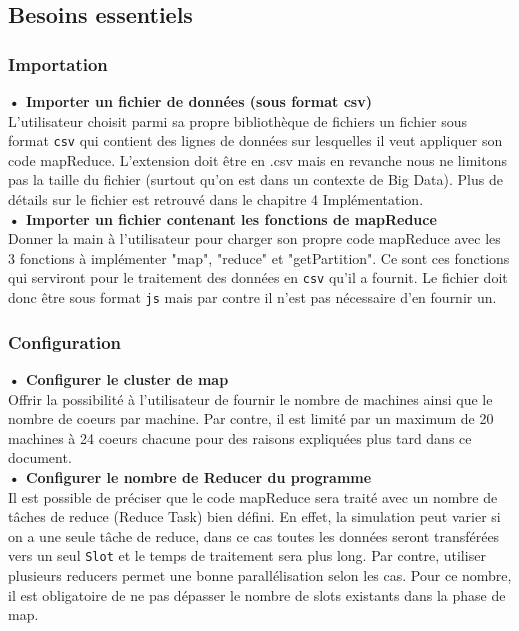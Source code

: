 \documentclass[12pt,a4paper]{article}
\begin{document}
\subsection{Besoins essentiels}


\subsubsection{Importation}

\textbf{• Importer un fichier de données (sous format csv)\\} L'utilisateur choisit parmi sa propre bibliothèque de fichiers un fichier sous format {\tt csv} qui contient des lignes de données sur lesquelles il veut appliquer son code mapReduce. L'extension doit être en .csv mais en revanche nous ne limitons pas la taille du fichier (surtout qu'on est dans un contexte de Big Data). Plus de détails sur le fichier est retrouvé dans le chapitre 4 Implémentation.\\

\textbf{• Importer un fichier contenant les fonctions de mapReduce\\}   
 Donner la main à l'utilisateur pour charger son propre code mapReduce avec les 3 fonctions à implémenter "map", "reduce" et "getPartition". Ce sont ces fonctions qui serviront pour le traitement des données en {\tt csv} qu'il a fournit. Le fichier doit donc être sous format {\tt js} mais par contre il n'est pas nécessaire d'en fournir un.\\

\subsubsection{Configuration} 

\textbf{• Configurer le cluster de map\\ } Offrir la possibilité à l'utilisateur de fournir le nombre de machines ainsi que le nombre de coeurs par machine. Par contre, il est limité par un maximum de 20 machines à 24 coeurs chacune pour des raisons expliquées plus tard dans ce document. \\

\textbf{• Configurer le nombre de Reducer du programme\\}  Il est possible de préciser que le code mapReduce sera traité avec un nombre de tâches de reduce (Reduce Task) bien défini. En effet, la simulation peut varier si on a une seule tâche de reduce, dans ce cas toutes les données seront transférées vers un seul {\tt Slot} et le temps de traitement sera plus long. Par contre, utiliser plusieurs reducers permet une bonne parallélisation selon les cas. Pour ce nombre, il est obligatoire de ne pas dépasser le nombre de slots existants dans la phase de map.  \\
\end{document}
